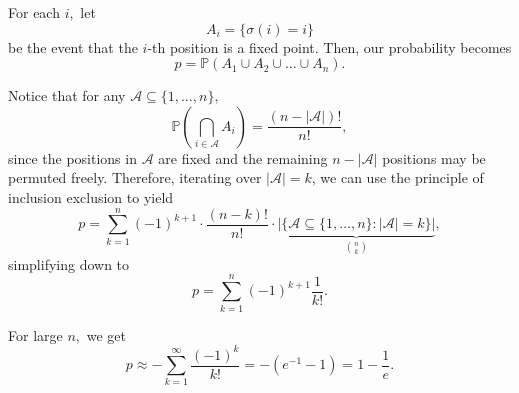 \documentclass[12pt]{article}
\begin{document}
\begin{enumerate}
\begin{enumerate}
        For each $i,$ let $$A_i = \{\sigma(i) = i\}$$ be the event
        that the $i$-th position is a fixed point. Then, our probability becomes
        $$
        p = \mathbb P(A_1 \cup A_2 \cup  \ldots \cup A_n).
        $$

        Notice that for any $\mathcal A \subseteq \{1, \ldots, n\},$ $$
        \mathbb P\left(\bigcap_{i \in \mathcal A} A_i\right) =
        \dfrac{(n - |\mathcal A|)!}{n!},
        $$
        since the positions in $\mathcal A$ are fixed and the
        remaining $n - |\mathcal A|$ positions may be permuted
        freely. Therefore, iterating over $|\mathcal A| = k$, we can
        use the principle of inclusion exclusion to yield
        $$
        p = \sum_{k = 1}^{n} (-1)^{k+1} \cdot \dfrac{(n - k)!}{n!}
        \cdot \underbrace{\left|\{\mathcal A \subseteq \{1, \ldots,
        n\} : |\mathcal A| = k\}\right|}_{n \choose k},
        $$
        simplifying down to
        $$
        p = \sum_{k = 1}^{n} (-1)^{k+1} \dfrac{1}{k!}.
        $$

        For large $n,$ we get $$
        p \approx -\sum_{k = 1}^{\infty} \dfrac{(-1)^{k}}{k!} =
        -\left(e^{-1} - 1\right) = 1 - \dfrac{1}{e}.
        $$
    \end{enumerate}
\end{enumerate}
\end{document}
